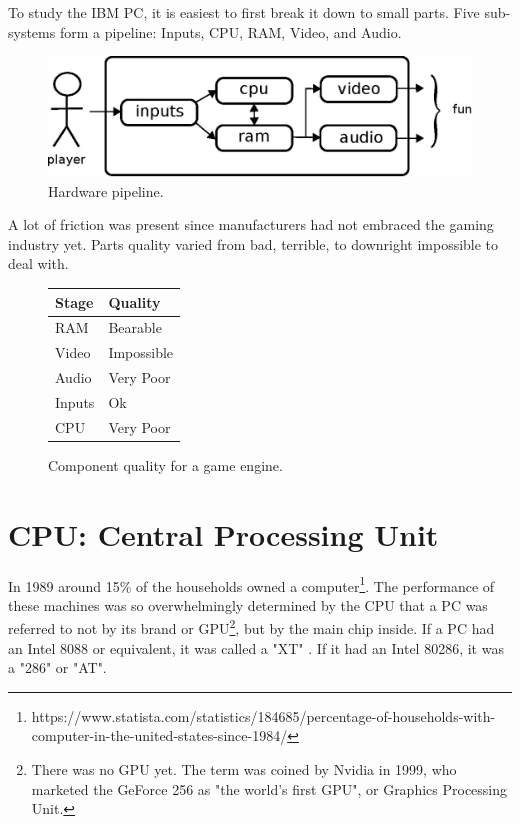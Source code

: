 \documentclass[book.tex]{subfiles}
\begin{document}
\label{chapter_hardware}
To study the IBM PC, it is easiest to first break it down to small parts. Five sub-systems form a pipeline: Inputs, CPU, RAM, Video, and Audio.\\
\begin{figure}[H]
\centering
\includegraphics[width=\textwidth]{imgs/drawings/fun_pipeline.eps}
\caption{Hardware pipeline.}
\label{fig:digraph}
\end{figure}

A lot of friction was present since manufacturers had not embraced the gaming industry yet. Parts quality varied from  bad, terrible, to downright impossible to deal with.\\
\par

\begin{figure}[H]
\centering
\begin{tabularx}{\textwidth}{ X X  }
  \toprule
  \textbf{Stage} & \textbf{Quality} \\ \bottomrule
  RAM & Bearable \\ 
  Video & Impossible \\ 
  Audio & Very Poor \\ 
  Inputs & Ok \\ 
  CPU & Very Poor \\ \bottomrule
\end{tabularx}
\caption{Component quality for a game engine.}
\end{figure}



\section{CPU: Central Processing Unit}
  


  In 1989 around 15\% of the households owned a computer\footnote{https://www.statista.com/statistics/184685/percentage-of-households-with-computer-in-the-united-states-since-1984/}. The performance of these machines was so overwhelmingly determined by the CPU that a PC was referred to not by its brand or GPU\footnote{There was no GPU yet. The term was coined by Nvidia in 1999, who marketed the GeForce 256 as "the world's first GPU", or Graphics Processing Unit.}, but by the main chip inside. If a PC had an Intel 8088 or equivalent, it was called a "XT" . If it had an Intel 80286, it was a "286" or "AT".\\
\end{document}
